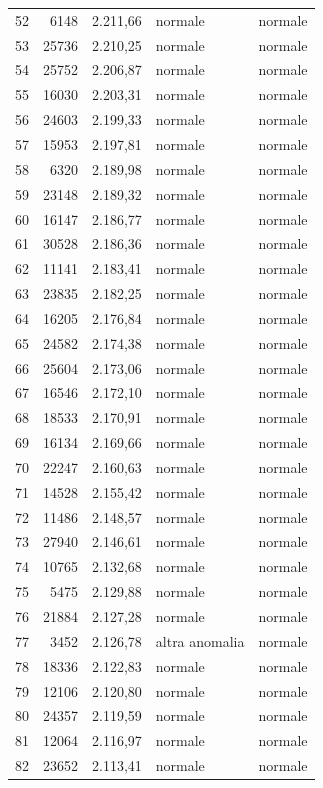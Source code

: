 {\begin{longtable}{rrrll}
52 & 6148 & 2.211,66 & normale & normale \\
53 & 25736 & 2.210,25 & normale & normale \\
54 & 25752 & 2.206,87 & normale & normale \\
55 & 16030 & 2.203,31 & normale & normale \\
56 & 24603 & 2.199,33 & normale & normale \\
57 & 15953 & 2.197,81 & normale & normale \\
58 & 6320 & 2.189,98 & normale & normale \\
59 & 23148 & 2.189,32 & normale & normale \\
60 & 16147 & 2.186,77 & normale & normale \\
61 & 30528 & 2.186,36 & normale & normale \\
62 & 11141 & 2.183,41 & normale & normale \\
63 & 23835 & 2.182,25 & normale & normale \\
64 & 16205 & 2.176,84 & normale & normale \\
65 & 24582 & 2.174,38 & normale & normale \\
66 & 25604 & 2.173,06 & normale & normale \\
67 & 16546 & 2.172,10 & normale & normale \\
68 & 18533 & 2.170,91 & normale & normale \\
69 & 16134 & 2.169,66 & normale & normale \\
70 & 22247 & 2.160,63 & normale & normale \\
71 & 14528 & 2.155,42 & normale & normale \\
72 & 11486 & 2.148,57 & normale & normale \\
73 & 27940 & 2.146,61 & normale & normale \\
74 & 10765 & 2.132,68 & normale & normale \\
75 & 5475 & 2.129,88 & normale & normale \\
76 & 21884 & 2.127,28 & normale & normale \\
77 & 3452 & 2.126,78 & altra anomalia & normale \\
78 & 18336 & 2.122,83 & normale & normale \\
79 & 12106 & 2.120,80 & normale & normale \\
80 & 24357 & 2.119,59 & normale & normale \\
81 & 12064 & 2.116,97 & normale & normale \\
82 & 23652 & 2.113,41 & normale & normale \\

\end{longtable}}
